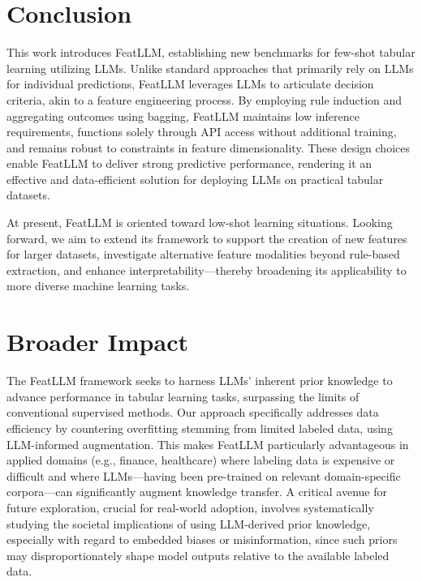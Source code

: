 \section{Conclusion}
This work introduces \textsf{FeatLLM}, establishing new benchmarks for few-shot tabular learning utilizing LLMs. Unlike standard approaches that primarily rely on LLMs for individual predictions, \textsf{FeatLLM} leverages LLMs to articulate decision criteria, akin to a feature engineering process. By employing rule induction and aggregating outcomes using bagging, \textsf{FeatLLM} maintains low inference requirements, functions solely through API access without additional training, and remains robust to constraints in feature dimensionality. These design choices enable \textsf{FeatLLM} to deliver strong predictive performance, rendering it an effective and data-efficient solution for deploying LLMs on practical tabular datasets.

At present, \textsf{FeatLLM} is oriented toward low-shot learning situations. Looking forward, we aim to extend its framework to support the creation of new features for larger datasets, investigate alternative feature modalities beyond rule-based extraction, and enhance interpretability—thereby broadening its applicability to more diverse machine learning tasks.

\section{Broader Impact}
The \textsf{FeatLLM} framework seeks to harness LLMs' inherent prior knowledge to advance performance in tabular learning tasks, surpassing the limits of conventional supervised methods. Our approach specifically addresses data efficiency by countering overfitting stemming from limited labeled data, using LLM-informed augmentation. This makes \textsf{FeatLLM} particularly advantageous in applied domains (e.g., finance, healthcare) where labeling data is expensive or difficult and where LLMs—having been pre-trained on relevant domain-specific corpora—can significantly augment knowledge transfer. A critical avenue for future exploration, crucial for real-world adoption, involves systematically studying the societal implications of using LLM-derived prior knowledge, especially with regard to embedded biases or misinformation, since such priors may disproportionately shape model outputs relative to the available labeled data.

